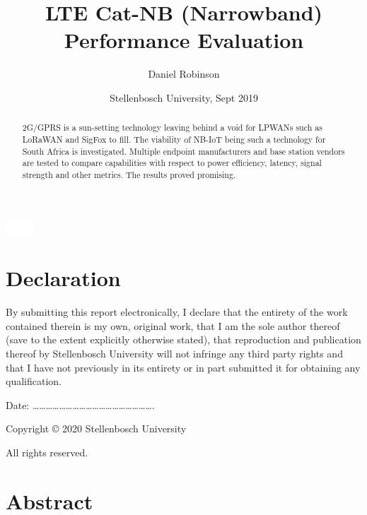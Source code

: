 \documentclass[]{article}
\title{LTE Cat-NB (Narrowband) Performance Evaluation}
\author{Daniel Robinson}
\date{Stellenbosch University, Sept 2019}
\let\origfigure\figure
\let\endorigfigure\endfigure
\renewenvironment{figure}[1][2] {
    \expandafter\origfigure\expandafter[H]
} {
    \endorigfigure
}
\begin{document}
\maketitle
\begin{abstract}
2G/GPRS is a sun-setting technology leaving behind a void for LPWANs
such as LoRaWAN and SigFox to fill. The viability of NB-IoT being such a
technology for South Africa is investigated. Multiple endpoint
manufacturers and base station vendors are tested to compare
capabilities with respect to power efficiency, latency, signal strength
and other metrics. The results proved promising.
\end{abstract}

{
\hypersetup{linkcolor=}
\setcounter{tocdepth}{3}
\tableofcontents
}
\listoftables
\listoffigures
\begin{figure}
\centering
\includegraphics{../images/whitespace.png}
\caption{}
\end{figure}

\newpage

\hypertarget{declaration}{%
\section*{Declaration}\label{declaration}}

By submitting this report electronically, I declare that the entirety of
the work contained therein is my own, original work, that I am the sole
author thereof (save to the extent explicitly otherwise stated), that
reproduction and publication thereof by Stellenbosch University will not
infringe any third party rights and that I have not previously in its
entirety or in part submitted it for obtaining any qualification.

\vspace{1cm}

Date:
\ldots{}\ldots{}\ldots{}\ldots{}\ldots{}\ldots{}\ldots{}\ldots{}\ldots{}\ldots{}\ldots{}\ldots{}\ldots{}\ldots{}\ldots{}\ldots{}\ldots{}\ldots{}.

\vspace{15cm}

Copyright © 2020 Stellenbosch University

All rights reserved.

\newpage

\hypertarget{abstract}{%
\section*{Abstract}\label{abstract}}
\end{document}
